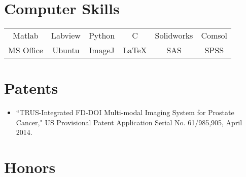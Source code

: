 \documentclass{my_cv}
\begin{document}
\section{Computer Skills}

\vspace{2pt} %
\begin{center}

\begin{tabular}{c|c|c|c|c|c} Matlab & Labview & Python & C &Solidworks &Comsol \\
MS Office& Ubuntu & ImageJ &\LaTeX &SAS &SPSS\end{tabular}
\end{center}


\vspace{-7mm}  %


\section{{Patents}} 

\vspace{-2mm} %
\begin{itemize} \itemsep -2pt %
\item ``TRUS-Integrated FD-DOI Multi-modal Imaging System for Prostate Cancer," US Provisional Patent Application Serial No. 61/985,905, April 2014. 
\end{itemize}


\vspace{-5mm} %


\section{{Honors}} 
\end{document}
